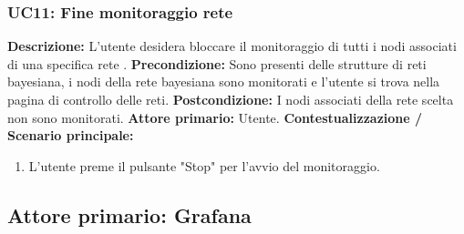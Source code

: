                         
                        
                        
                        
            \subsubsection{UC11: Fine monitoraggio rete}
                    \textbf{Descrizione:}  L’utente desidera bloccare il monitoraggio di tutti i nodi associati di una specifica rete .
                    \newline
                    \textbf{Precondizione:} Sono presenti delle strutture di reti bayesiana, i nodi della rete bayesiana sono monitorati e l'utente si trova nella pagina di controllo delle reti.
                    \newline
                    \textbf{Postcondizione:} I nodi associati della rete scelta non sono monitorati.
                    \newline
                    \textbf{Attore primario:} Utente.
                    \newline
                    \textbf{Contestualizzazione / Scenario principale:} \begin{enumerate}
                            \item L'utente preme il pulsante "Stop" per l'avvio del monitoraggio.
                        \end{enumerate}
				
		\subsection{Attore primario: Grafana}	
		

